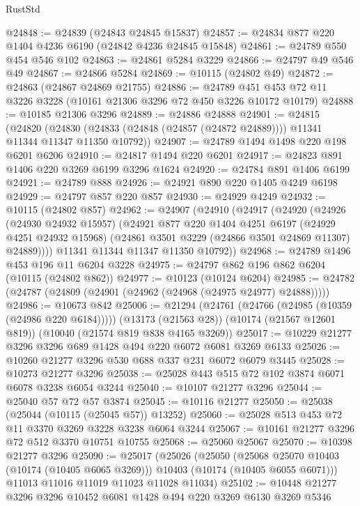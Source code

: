 \begin{lexlean}{RustStd}
\begin{coremodule}
@24848 := @24839 (@24843 @24845 @15837)
@24857 := @24834 @877 @220 @1404 @4236 @6190 (@24842 @4236 @24845 @15848)
@24861 := @24789 @550 @454 @546 @102
@24863 := @24861 @5284 @3229
@24866 := @24797 @49 @546 @49
@24867 := @24866 @5284
@24869 := @10115 (@24802 @49)
@24872 := @24863 (@24867 @24869 @21755)
@24886 := @24789 @451 @453 @72 @11 @3226 @3228 (@10161 @21306 @3296 @72 @450 @3226 @10172 @10179)
@24888 := @10185 @21306 @3296
@24889 := @24886 @24888
@24901 := @24815
    (@24820 (@24830 (@24833 (@24848 (@24857 (@24872 @24889)))) @11341 @11344 @11347 @11350 @10792))
@24907 := @24789 @1494 @1498 @220 @198 @6201 @6206
@24910 := @24817 @1494 @220 @6201
@24917 := @24823 @891 @1406 @220 @3269 @6199 @3296 @1624
@24920 := @24784 @891 @1406 @6199
@24921 := @24789 @888
@24926 := @24921 @890 @220 @1405 @4249 @6198
@24929 := @24797 @857 @220 @857
@24930 := @24929 @4249
@24932 := @10115 (@24802 @857)
@24962 := @24907
    (@24910
      (@24917
        (@24920
          (@24926
            (@24930 @24932 @15957)
            (@24921
              @877
              @220
              @1404
              @4251
              @6197
              (@24929 @4251 @24932 @15968)
              (@24861 @3501 @3229 (@24866 @3501 @24869 @11307) @24889))))
        @11341
        @11344
        @11347
        @11350
        @10792))
@24968 := @24789 @1496 @453 @196 @11 @6204 @3228
@24975 := @24797 @862 @196 @862 @6204 (@10115 (@24802 @862))
@24977 := @10123 (@10124 @6204)
@24985 := @24782 (@24787 (@24809 (@24901 (@24962 (@24968 (@24975 @24977) @24888)))))
@24986 := @10673 @842
@25006 := @21294
    (@24761 (@24766 (@24985 (@10359 (@24986 @220 @6184)))))
    (@13173 (@21563 @28))
    (@10174 (@21567 @12601 @819))
    (@10040 (@21574 @819 @838 @4165 @3269))
@25017 := @10229 @21277 @3296 @3296 @689 @1428 @494 @220 @6072 @6081 @3269 @6133
@25026 := @10260 @21277 @3296 @530 @688 @337 @231 @6072 @6079 @3445
@25028 := @10273 @21277 @3296
@25038 := @25028 @443 @515 @72 @102 @3874 @6071 @6078 @3238 @6054 @3244
@25040 := @10107 @21277 @3296
@25044 := @25040 @57 @72 @57 @3874
@25045 := @10116 @21277
@25050 := @25038 (@25044 (@10115 (@25045 @57)) @13252)
@25060 := @25028 @513 @453 @72 @11 @3370 @3269 @3228 @3238 @6064 @3244
@25067 := @10161 @21277 @3296 @72 @512 @3370 @10751 @10755
@25068 := @25060 @25067
@25070 := @10398 @21277 @3296
@25090 := @25017
    (@25026
      (@25050
        (@25068 @25070 @10403 (@10174 (@10405 @6065 @3269)))
        @10403
        (@10174 (@10405 @6055 @6071)))
      @11013
      @11016
      @11019
      @11023
      @11028
      @11034)
@25102 := @10448 @21277 @3296 @3296 @10452 @6081 @1428 @494 @220 @3269 @6130 @3269 @5346

\end{coremodule}
\end{lexlean}
